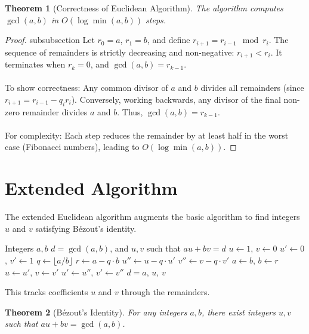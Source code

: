 \documentclass[12pt,openany]{book}
\theoremstyle{definition}
\theoremstyle{plain}
\newtheorem{theorem}{Theorem}[chapter]
\theoremstyle{remark}
\begin{document}
\begin{theorem}[Correctness of Euclidean Algorithm]
  The algorithm computes $\gcd(a, b)$ in $O(\log \min(a, b))$ steps.
\end{theorem}

\begin{proof}\*subsubsection{}
  Let $r_0 = a$, $r_1 = b$, and define $r_{i+1} = r_{i-1} \mod r_i$. The sequence of remainders is strictly decreasing and non-negative: $r_{i+1} < r_i$. It terminates when $r_k = 0$, and $\gcd(a, b) = r_{k-1}$.
  \noindent
  \\ \\
  To show correctness: Any common divisor of $a$ and $b$ divides all remainders (since $r_{i+1} = r_{i-1} - q_i r_i$). Conversely, working backwards, any divisor of the final non-zero remainder divides $a$ and $b$. Thus, $\gcd(a, b) = r_{k-1}$.
  \noindent
  \\ \\
  For complexity: Each step reduces the remainder by at least half in the worst case (Fibonacci numbers), leading to $O(\log \min(a, b))$.
\end{proof}

\section{Extended Algorithm}

The extended Euclidean algorithm augments the basic algorithm to find integers $u$ and $v$ satisfying Bézout's identity.

\begin{algorithm}[H]
\caption{Extended Euclidean Algorithm}
\begin{algorithmic}[1]
\Require Integers $a, b$
\Ensure $d = \gcd(a, b)$, and $u, v$ such that $a u + b v = d$
\State $u \gets 1$, $v \gets 0$
\State $u' \gets 0$, $v' \gets 1$
  \State $q \gets \lfloor a / b \rfloor$
  \State $r \gets a - q \cdot b$
  \State $u'' \gets u - q \cdot u'$
  \State $v'' \gets v - q \cdot v'$
  \State $a \gets b$, $b \gets r$
  \State $u \gets u'$, $v \gets v'$
  \State $u' \gets u''$, $v' \gets v''$
\EndWhile
\State \Return $d = a$, $u$, $v$
\end{algorithmic}
\end{algorithm}
\noindent
This tracks coefficients $u$ and $v$ through the remainders.
\\
\begin{theorem}[Bézout's Identity]
  For any integers $a, b$, there exist integers $u, v$ such that $a u + b v = \gcd(a, b)$.
\end{theorem}
\end{document}
